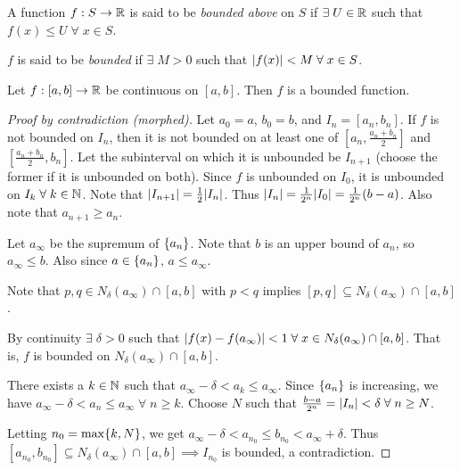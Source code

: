 \documentclass[12pt]{article}
\begin{document}
\begin{defn} \label{defn:bounded fn}
    A function $f : S \to \mathbb{R}$ is said to be \emph{bounded above} on $S$ if $\exists\; U \in \mathbb{R}$ such that $f(x) \leq U \;\forall\; x \in S$.

    $f$ is said to be \emph{bounded} if $\exists\; M > 0$ such that $\abs{ f(x) } < M \;\forall\; x \in S$.
\end{defn}

\begin{thm} \label{thm:closed bounded}
    Let $f : [a, b] \to \mathbb{R}$ be continuous on $[a, b]$. Then $f$ is a bounded function.
\end{thm}
\begin{proof}[Proof by contradiction \textcolor{red!70!black}{(morphed)}]
    Let $a_{0} = a$, $b_{0} = b$, and $I_{n} = [a_{n}, b_{n}]$. If $f$ is not bounded on $I_{n}$, then it is not bounded on at least one of $[a_{n}, \frac{a_{n} + b_{n}}{2}]$ and $[\frac{a_{n} + b_{n}}{2}, b_{n}]$. Let the subinterval on which it is unbounded be $I_{n+1}$ (choose the former if it is unbounded on both). Since $f$ is unbounded on $I_{0}$, it is unbounded on $I_{k} \;\forall\; k \in \mathbb{N}$. Note that $\abs{ I_{n+1} } = \frac{1}{2} \abs{ I_{n} }$. Thus $\abs{ I_{n} } = \frac{1}{2^{n}} \abs{ I_{0} } = \frac{1}{2^{n}} (b - a)$. Also note that $a_{n+1} \geq a_{n}$.

    Let $a_{\infty}$ be the supremum of $\set{a_{n}}$. Note that $b$ is an upper bound of $a_{n}$, so $a_{\infty} \leq b$. Also since $a \in \set{a_{n}}$, $a \leq a_{\infty}$.

    Note that $p, q \in N_{\delta}(a_{\infty}) \cap [a, b]$ with $p < q$ implies $[p, q] \subseteq N_{\delta}(a_{\infty}) \cap [a, b]$.

    By continuity $\exists\; \delta > 0$ such that $\abs{ f(x) - f(a_{\infty}) } < 1 \;\forall\; x \in N_{\delta}(a_{\infty}) \cap [a, b]$. That is, $f$ is bounded on $N_{\delta}(a_{\infty}) \cap [a, b]$.

    There exists a $k \in \mathbb{N}$ such that $a_{\infty} - \delta < a_{k} \leq a_{\infty}$. Since $\set{a_{n}}$ is increasing, we have $a_{\infty} - \delta < a_{n} \leq a_{\infty} \;\forall\; n \geq k$. Choose $N$ such that $\frac{b - a}{2^{n}} = \abs{ I_{n} } < \delta \;\forall\; n \geq N$.

    Letting $n_{0} = \max \set{k, N}$, we get $a_{\infty} - \delta < a_{n_{0}} \leq b_{n_{0}} < a_{\infty} + \delta$. Thus $[a_{n_{0}}, b_{n_{0}}] \subseteq N_{\delta}(a_{\infty}) \cap [a, b] \implies I_{n_{0}}$ is bounded, a contradiction. 
\end{proof}
\end{document}
